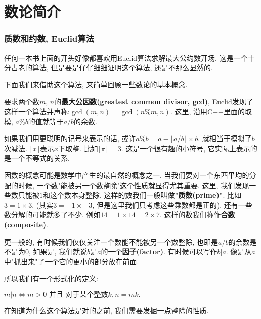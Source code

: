 \part{数论简介}

\section{质数和约数, Euclid算法}

任何一本书上面的开头好像都喜欢用Euclid算法求解最大公约数开场. 
这是一个十分古老的算法, 但是要是仔仔细细证明这个算法, 还是不那么显然的. 

下面我们来借助这个算法, 来简单回顾一些数论的基本概念. 

要求两个数$m$, $n$的\textbf{最大公因数(greatest common divisor, gcd)}, 
Euclid发现了这样一个算法并声称:$\gcd(m, n) = \gcd(n\%m, n)$. 
这里, 沿用C++里面的取模, $a\%b$的值就等于$a/ b$的余数. 

如果我们用更聪明的记号来表示的话, 或许$a\%b=a-\lfloor a/b\rfloor\times b$. 
就相当于模拟了$b$次减法. $\lfloor x\rfloor$表示$x$下取整. 比如$\lfloor \pi\rfloor=3$. 
这是一个很有趣的小符号, 它实际上表示的是一个不等式的关系. 

因数的概念可能是数学中产生的最自然的概念之一. 
当我们要对一个东西平均的分配的时候, 一个数"能被另一个数整除"这个性质就显得尤其重要. 
这里, 我们发现一些数只能被$1$和这个数本身整除, 
这样的数我们一般叫做\textbf{"质数(prime)"}. 比如$3=1\times3$. 
(其实$3=-1\times -3$, 但是这里我们只考虑这些乘数都是正的). 
还有一些数分解的可能就多了不少. 例如$14=1\times 14 = 2\times 7$. 
这样的数我们称作\textbf{合数(composite)}.

更一般的, 有时候我们仅仅关注一个数能不能被另一个数整除,
也即是$a/ b$的余数是不是为0, 如果是, 
我们就说$b$是$a$的一个\textbf{因子(factor)}. 
有时候可以写作$b|a$. 像是从$a$中"抓出来"了一个它的更小的部分放在前面. 

所以我们有一个形式化的定义: 

\begin{definition}
    $m | n \iff m>0 \text{ 并且 } \text{对于某个整数}k, n=mk. $
\end{definition}

在知道为什么这个算法是对的之前, 我们需要发掘一点整除的性质. 